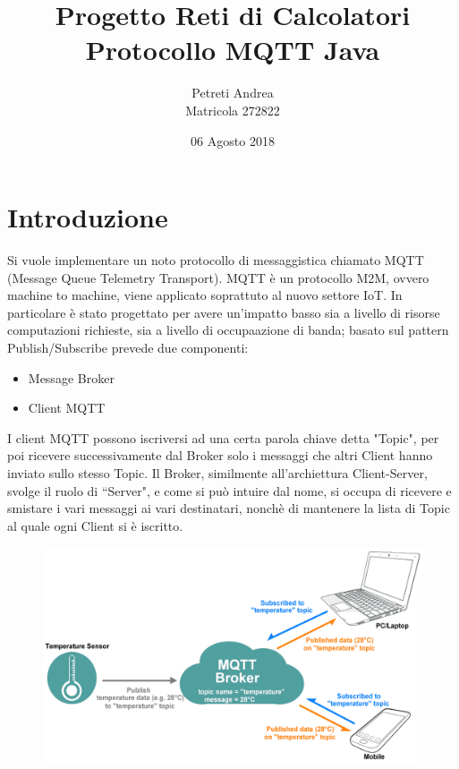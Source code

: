 \documentclass{article}
\title{Progetto Reti di Calcolatori \\[5em] 
\large Protocollo MQTT Java}
\author{Petreti Andrea\\\small Matricola 272822}
\date{06 Agosto 2018}
\begin{document}
\maketitle
\thispagestyle{empty}

\newpage 

\renewcommand{\contentsname}{Indice}

\tableofcontents

\newpage

\section{Introduzione}
Si vuole implementare un noto protocollo di messaggistica chiamato MQTT (Message Queue Telemetry Transport). MQTT è un protocollo M2M, ovvero machine to machine, viene applicato soprattuto al nuovo settore IoT. In particolare è stato progettato per avere un'impatto basso sia a livello di risorse computazioni richieste, sia a livello di occupaazione di banda; basato sul pattern Publish/Subscribe prevede due componenti:
\begin{itemize}
	\item Message Broker
	\item Client MQTT
\end{itemize}
I client MQTT possono iscriversi ad una certa parola chiave detta "Topic", per poi ricevere successivamente dal Broker solo i messaggi che altri Client hanno inviato sullo stesso Topic. Il Broker, similmente all'archiettura Client-Server, svolge il ruolo di ``Server", e come si può intuire dal nome, si occupa di ricevere e smistare i vari messaggi ai vari destinatari, nonchè di mantenere la lista di Topic al quale ogni Client si è iscritto.

\begin{figure}[htbp]
	\centerline{
		\includegraphics[scale=0.2]{immagini/broker_client_img.png}
	}
\end{figure}
\end{document}
